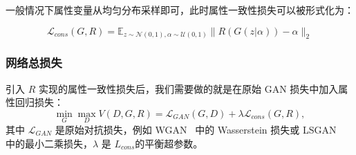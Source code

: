 

一般情况下属性变量从均匀分布采样即可，此时属性一致性损失可以被形式化为：

\begin{equation}
     \mathcal{L}_{cons}(G, R)  =  \mathbb{E}_{z \sim \mathcal{N}(0,1), \alpha \sim \mathcal{U}(0,1)}\|R(G(z|\alpha)) - \alpha\|_2
\end{equation}

\subsubsection{网络总损失}
引入 $R$ 实现的属性一致性损失后，我们需要做的就是在原始 GAN 损失中加入属性回归损失：
\begin{equation}
     \min _{G} \max _{D} V(D, G, R) = \mathcal{L}_{GAN}(G, D) + \lambda \mathcal{L}_{cons}(G, R),
     \label{overall}
\end{equation}
其中 $\mathcal{L}_{GAN}$ 是原始对抗损失，例如 WGAN~\cite{wgan} 中的 Wasserstein 损失或 LSGAN~\cite{lsgan} 中的最小二乘损失，$\lambda$ 是 $L_{cons}$的平衡超参数。

